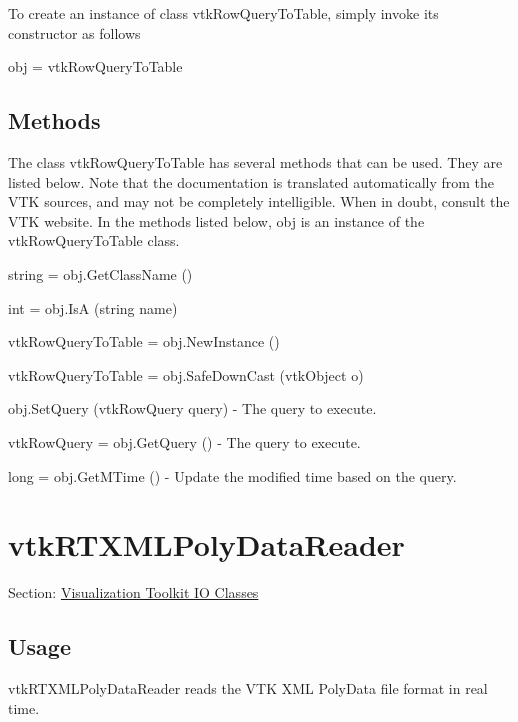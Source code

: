To create an instance of class vtk\-Row\-Query\-To\-Table, simply invoke its constructor as follows \begin{DoxyVerb}  obj = vtkRowQueryToTable
\end{DoxyVerb}
 \hypertarget{vtkwidgets_vtkxyplotwidget_Methods}{}\subsection{Methods}\label{vtkwidgets_vtkxyplotwidget_Methods}
The class vtk\-Row\-Query\-To\-Table has several methods that can be used. They are listed below. Note that the documentation is translated automatically from the V\-T\-K sources, and may not be completely intelligible. When in doubt, consult the V\-T\-K website. In the methods listed below, {\ttfamily obj} is an instance of the vtk\-Row\-Query\-To\-Table class. 
\begin{DoxyItemize}
\item {\ttfamily string = obj.\-Get\-Class\-Name ()}  
\item {\ttfamily int = obj.\-Is\-A (string name)}  
\item {\ttfamily vtk\-Row\-Query\-To\-Table = obj.\-New\-Instance ()}  
\item {\ttfamily vtk\-Row\-Query\-To\-Table = obj.\-Safe\-Down\-Cast (vtk\-Object o)}  
\item {\ttfamily obj.\-Set\-Query (vtk\-Row\-Query query)} -\/ The query to execute.  
\item {\ttfamily vtk\-Row\-Query = obj.\-Get\-Query ()} -\/ The query to execute.  
\item {\ttfamily long = obj.\-Get\-M\-Time ()} -\/ Update the modified time based on the query.  
\end{DoxyItemize}\hypertarget{vtkio_vtkrtxmlpolydatareader}{}\section{vtk\-R\-T\-X\-M\-L\-Poly\-Data\-Reader}\label{vtkio_vtkrtxmlpolydatareader}
Section\-: \hyperlink{sec_vtkio}{Visualization Toolkit I\-O Classes} \hypertarget{vtkwidgets_vtkxyplotwidget_Usage}{}\subsection{Usage}\label{vtkwidgets_vtkxyplotwidget_Usage}
vtk\-R\-T\-X\-M\-L\-Poly\-Data\-Reader reads the V\-T\-K X\-M\-L Poly\-Data file format in real time.

